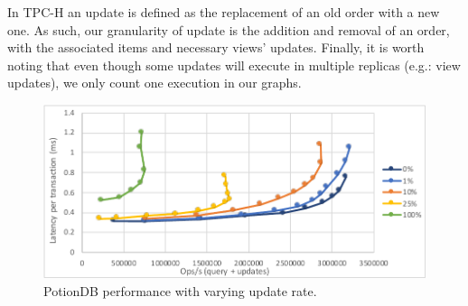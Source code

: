 \documentclass{vldb}
\begin{document}
In TPC-H an update is defined as the replacement of an old order with a new one.
As such, our granularity of update is the addition and removal of an order, with the associated items and necessary views' updates.
Finally, it is worth noting that even though some updates will execute in multiple replicas (e.g.: view updates), we only count one execution in our graphs.

\begin{figure}
	\centering
	\includegraphics[width=.95\linewidth]{updRate_global_cut}
	\caption{PotionDB performance with varying update rate.}
	\label{fig:update_rates}
\end{figure}
\end{document}
